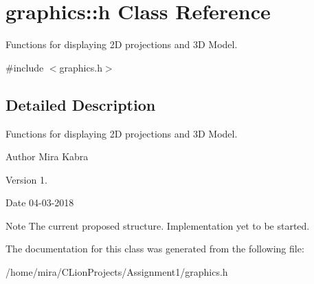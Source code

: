 \hypertarget{classgraphics_1_1h}{}\section{graphics\+:\+:h Class Reference}
\label{classgraphics_1_1h}


Functions for displaying 2D projections and 3D Model.  




{\ttfamily \#include $<$graphics.\+h$>$}



\subsection{Detailed Description}
Functions for displaying 2D projections and 3D Model. 

\begin{DoxyAuthor}{Author}
Mira Kabra 
\end{DoxyAuthor}
\begin{DoxyVersion}{Version}
1. 
\end{DoxyVersion}
\begin{DoxyDate}{Date}
04-\/03-\/2018 
\end{DoxyDate}
\begin{DoxyNote}{Note}
The current proposed structure. Implementation yet to be started. 
\end{DoxyNote}


The documentation for this class was generated from the following file\+:\begin{DoxyCompactItemize}
\item 
/home/mira/\+C\+Lion\+Projects/\+Assignment1/graphics.\+h\end{DoxyCompactItemize}
